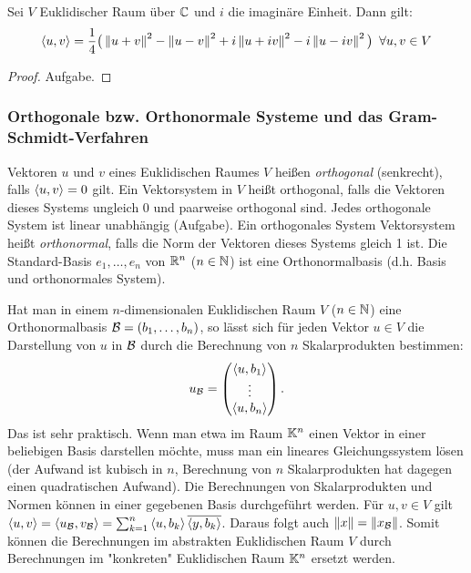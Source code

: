 \begin{propn}
	Sei $ V $ Euklidischer Raum über $ \mathbb C $ und $ i $ die imaginäre Einheit. Dann gilt:
	\begin{equation}
		\left\langle u,v \right\rangle = \frac{1}{4} \big( \left\| u+v \right\|^2 - \left\| u-v \right\|^2 + i\left\| u+iv \right\|^2 - i\left\| u-iv \right\|^2 \big) \enspace \forall u, v \in V
	\end{equation}
\end{propn}
\begin{proof}
	Aufgabe.
\end{proof}

\subsubsection{Orthogonale bzw. Orthonormale Systeme und das Gram-Schmidt-Verfahren}

Vektoren $ u $ und $ v $ eines Euklidischen Raumes $ V $ heißen \emph{orthogonal} (senkrecht), falls $ \left\langle u,v \right\rangle = 0 $ gilt. Ein Vektorsystem in $ V $ heißt orthogonal, falls die Vektoren dieses Systems ungleich 0 und paarweise orthogonal sind. Jedes orthogonale System ist linear unabhängig (Aufgabe). Ein orthogonales System Vektorsystem heißt \emph{orthonormal}, falls die Norm der Vektoren dieses Systems gleich 1 ist. Die Standard-Basis $ e_1, \ldots, e_n $ von $ \mathbb R^n $ ($ n \in  \mathbb N $) ist eine Orthonormalbasis (d.h. Basis und orthonormales System).

Hat man in einem $ n $-dimensionalen Euklidischen Raum $ V $ ($ n \in \mathbb N $) eine Orthonormalbasis $ \mathcal{B} = (b_1, \ldots, b_n) $, so lässt sich für jeden Vektor $ u \in V $ die Darstellung von $ u $ in $ \mathcal{B} $ durch die Berechnung von $ n $ Skalarprodukten bestimmen:
\begin{equation*}
	u_{\mathcal{B}} = \begin{pmatrix}
		\left\langle u,b_1 \right\rangle \\ \vdots \\ \left\langle u,b_n \right\rangle
	\end{pmatrix}.
\end{equation*}
Das ist sehr praktisch. Wenn man etwa im Raum $\mathbb K^n$ einen Vektor in einer beliebigen Basis darstellen möchte, muss man ein lineares Gleichungssystem lösen (der Aufwand ist kubisch in $n$, Berechnung von $n$ Skalarprodukten hat dagegen einen quadratischen Aufwand). Die Berechnungen von Skalarprodukten und Normen können in einer gegebenen Basis durchgeführt werden.
Für $ u,v \in V $ gilt $ \left\langle u,v \right\rangle = \left\langle u_{\mathcal{B}},v_{\mathcal{B}} \right\rangle = \sum_{k=1}^{n} \left\langle u,b_k \right\rangle \overline{\left\langle y,b_k \right\rangle} $. Daraus folgt auch $ \left\| x \right\| = \left\| x_{\mathcal{B}} \right\| $. Somit können die Berechnungen im abstrakten Euklidischen Raum $ V $ durch Berechnungen im "konkreten" Euklidischen Raum $ \mathbb K^n $ ersetzt werden.

